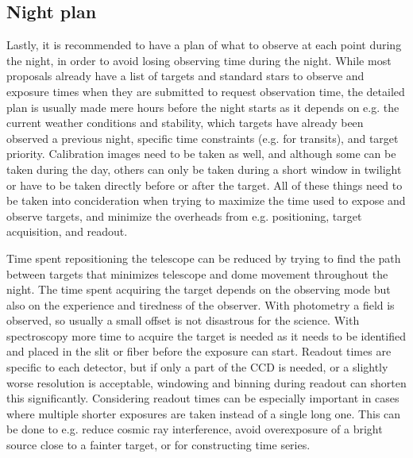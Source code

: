 \documentclass[a4paper,oneside,12pt, class=Latex/Classes/PhDthesisPSnPDF, crop=false]{standalone}
\begin{document}
\subsection{Night plan}
Lastly, it is recommended to have a plan of what to observe at each point during the night, in order to avoid losing observing time during the night. While most proposals already have a list of targets and standard stars to observe and exposure times when they are submitted to request observation time, the detailed plan is usually made mere hours before the night starts as it depends on e.g. the current weather conditions and stability, which targets have already been observed a previous night, specific time constraints (e.g. for transits), and target priority. Calibration images need to be taken as well, and although some can be taken during the day, others can only be taken during a short window in twilight or have to be taken directly before or after the target. All of these things need to be taken into concideration when trying to maximize the time used to expose and observe targets, and minimize the overheads from e.g. positioning, target acquisition, and readout.

Time spent repositioning the telescope can be reduced by trying to find the path between targets that minimizes telescope and dome movement throughout the night. The time spent acquiring the target depends on the observing mode but also on the experience and tiredness of the observer. With photometry a field is observed, so usually a small offset is not disastrous for the science. With spectroscopy more time to acquire the target is needed as it needs to be identified and placed in the slit or fiber before the exposure can start. Readout times are specific to each detector, but if only a part of the CCD is needed, or a slightly worse resolution is acceptable, windowing and binning during readout can shorten this significantly. Considering readout times can be especially important in cases where multiple shorter exposures are taken instead of a single long one. This can be done to e.g. reduce cosmic ray interference, avoid overexposure of a bright source close to a fainter target, or for constructing time series.
\end{document}

